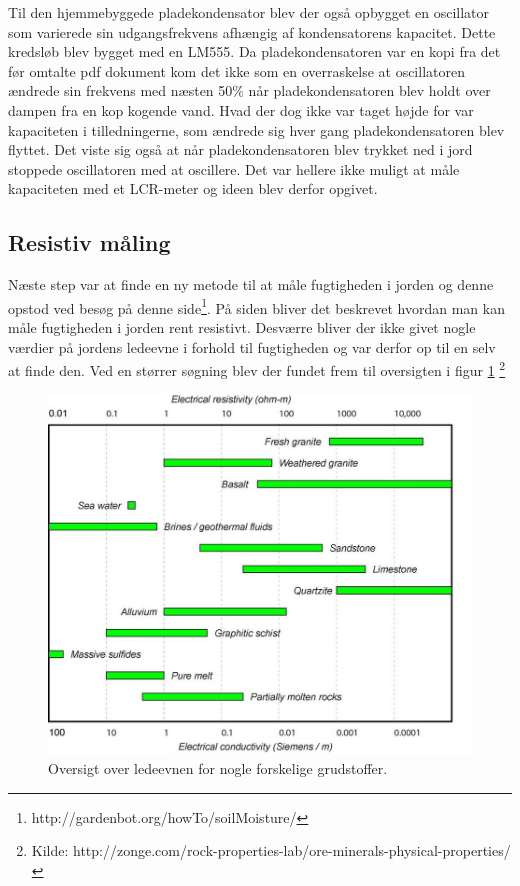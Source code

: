 Til den hjemmebyggede pladekondensator blev der også opbygget en oscillator som varierede sin udgangsfrekvens afhængig af kondensatorens kapacitet. Dette kredsløb blev bygget med en LM555. Da pladekondensatoren var en kopi fra det før omtalte pdf dokument kom det ikke som en overraskelse at oscillatoren ændrede sin frekvens med næsten 50\% når pladekondensatoren blev holdt over dampen fra en kop kogende vand. Hvad der dog ikke var taget højde for var kapaciteten i tilledningerne, som ændrede sig hver gang pladekondensatoren blev flyttet. Det viste sig også at når pladekondensatoren blev trykket ned i jord stoppede oscillatoren med at oscillere. Det var hellere ikke muligt at måle kapaciteten med et LCR-meter og ideen blev derfor opgivet. 

\subsection{Resistiv måling}
Næste step var at finde en ny metode til at måle fugtigheden i jorden og denne opstod ved besøg på denne side\footnote{http://gardenbot.org/howTo/soilMoisture/}.  På siden bliver det beskrevet hvordan man kan måle fugtigheden i jorden rent resistivt. Desværre bliver der ikke givet nogle værdier på jordens ledeevne i forhold til fugtigheden og var derfor op til en selv at finde den. Ved en størrer søgning blev der fundet frem til oversigten i figur \ref{photo:Ledeevne_grundstoffer} \footnote{Kilde: http://zonge.com/rock-properties-lab/ore-minerals-physical-properties/}

\begin{figure}[H]
	\centering 
	\includegraphics[scale=0.5]{HardwareArkitektur/Sensore/Jordfugt_billeder/soil_conductivity_types.JPG}
	\caption{Oversigt over ledeevnen for nogle forskelige grudstoffer.}
	\label{photo:Ledeevne_grundstoffer}
\end{figure}

